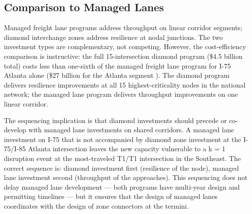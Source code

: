\subsection{Comparison to Managed Lanes}

Managed freight lane programs address throughput on linear corridor segments; diamond interchange zones address resilience at nodal junctions. The two investment types are complementary, not competing. However, the cost-efficiency comparison is instructive: the full 15-intersection diamond program (\$4.5 billion total) costs less than one-sixth of the managed freight lane program for I-75 Atlanta alone (\$27 billion for the Atlanta segment \citep{ROUTE_E1}). The diamond program delivers resilience improvements at all 15 highest-criticality nodes in the national network; the managed lane program delivers throughput improvements on one linear corridor.

The sequencing implication is that diamond investments should precede or co-develop with managed lane investments on shared corridors. A managed lane investment on I-75 that is not accompanied by diamond zone investment at the I-75/I-85 Atlanta intersection leaves the new capacity vulnerable to a k = 1 disruption event at the most-traveled T1/T1 intersection in the Southeast. The correct sequence is: diamond investment first (resilience of the node), managed lane investment second (throughput of the approaches). This sequencing does not delay managed lane development --- both programs have multi-year design and permitting timelines --- but it ensures that the design of managed lanes coordinates with the design of zone connectors at the termini.
